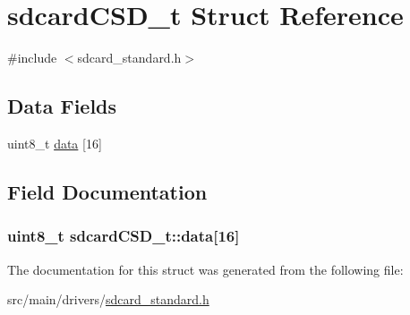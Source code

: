 \hypertarget{structsdcardCSD__t}{\section{sdcard\+C\+S\+D\+\_\+t Struct Reference}
\label{structsdcardCSD__t}
}


{\ttfamily \#include $<$sdcard\+\_\+standard.\+h$>$}

\subsection*{Data Fields}
\begin{DoxyCompactItemize}
\item 
uint8\+\_\+t \hyperlink{structsdcardCSD__t_a23d27139dd91fee44f82deddc90eee0e}{data} \mbox{[}16\mbox{]}
\end{DoxyCompactItemize}


\subsection{Field Documentation}
\hypertarget{structsdcardCSD__t_a23d27139dd91fee44f82deddc90eee0e}{
\subsubsection[{data}]{\setlength{\rightskip}{0pt plus 5cm}uint8\+\_\+t sdcard\+C\+S\+D\+\_\+t\+::data\mbox{[}16\mbox{]}}}\label{structsdcardCSD__t_a23d27139dd91fee44f82deddc90eee0e}


The documentation for this struct was generated from the following file\+:\begin{DoxyCompactItemize}
\item 
src/main/drivers/\hyperlink{sdcard__standard_8h}{sdcard\+\_\+standard.\+h}\end{DoxyCompactItemize}
